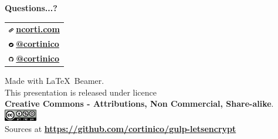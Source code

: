 \documentclass[xcolor=svgnames,11pt]{beamer}
\begin{document}
\begin{frame}{}
\begin{center}
\begin{Huge}
{\color{leorange} \textbf{Questions...?}}
\end{Huge}

\vspace{1.5cm}

\begin{center}
\begin{tabular}{>{\centering\arraybackslash}p{4cm}}
\includegraphics[height=0.2cm]{img/logo_web.pdf} \textbf{\href{https://ncorti.com}{ ncorti.com}} \\
\includegraphics[height=0.2cm]{img/logo_twitter.pdf} \textbf{\href{https://twitter.com/cortinico}{ @cortinico}} \\
\includegraphics[height=0.2cm]{img/logo_gh.pdf} \textbf{\href{https://github.com/cortinico}{ @cortinico}} \\
\end{tabular}
\end{center}

\bigskip

\begin{footnotesize}
Made with \LaTeX\ Beamer.\\
This presentation is released under licence \\
\textbf{Creative Commons - Attributions, Non Commercial, Share-alike}.
\\
\medskip
\includegraphics[height=0.5cm]{img/cc.png}
\\
\medskip
Sources at \textbf{\url{https://github.com/cortinico/gulp-letsencrypt}}
\end{footnotesize}

\end{center}
\end{frame}
\end{document}
